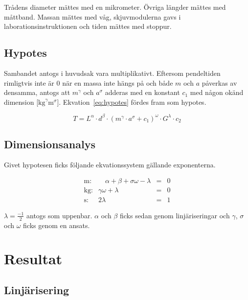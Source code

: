 \documentclass[a4paper,12pt]{article}
\begin{document}
Trådens diameter mättes med en mikrometer. Övriga längder mättes med måttband.
Massan mättes med våg, skjuvmodulerna gavs i laborationsinstruktionen och
tiden mättes med stoppur.

\subsection{Hypotes}

Sambandet antogs i huvudsak vara multiplikativt. Eftersom pendeltiden rimligtvis
inte är 0 när en massa inte hängs på och både $m$ och $a$ påverkas av densamma,
antogs att $m^\gamma$ och $a^\sigma$ adderas med en konstant $c_1$ med någon
okänd dimension [$\si{\kilogram}^\gamma\si{\meter}^\sigma$]. Ekvation~\eqref{eq:hypotes}
fördes fram som hypotes.

\begin{equation}
  T = L^\alpha \cdot d^\beta \cdot (m^\gamma \cdot a^\sigma + c_1)^\omega \cdot G^\lambda \cdot c_2
  \label{eq:hypotes}
\end{equation}

\subsection{Dimensionsanalys}

Givet hypotesen ficks följande ekvationssystem gällande exponenterna.

\begin{equation}
  \begin{array}{rrcc}
    \text{m:} & \hspace{1em} \alpha + \beta + \sigma \omega - \lambda & = & 0 \\
    \text{kg:} & \gamma \omega + \lambda & = & 0 \\
    \text{s:} & 2\lambda & = & 1
  \end{array}
  \label{eq:system}
\end{equation}

$\lambda = \frac{-1}{2}$ antogs som uppenbar. $\alpha$ och $\beta$ ficks sedan genom
linjäriseringar och $\gamma$, $\sigma$ och $\omega$ ficks genom en ansats.


\section{Resultat}

\subsection{Linjärisering}
\end{document}
